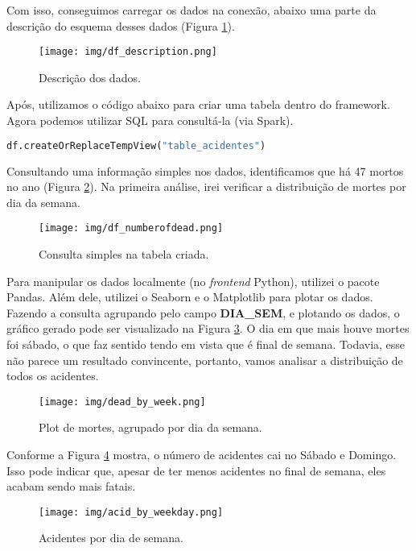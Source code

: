 \documentclass{article}
\begin{document}
Com isso, conseguimos carregar os dados na conexão, abaixo uma parte da descrição do esquema desses dados (Figura \ref{fig:df_description}).

\begin{figure}[H]
  \centering
  \texttt{[image: img/df\_description.png]}
  \caption{Descrição dos dados.}
  \label{fig:df_description}
\end{figure}

Após, utilizamos o código abaixo para criar uma tabela dentro do framework. Agora podemos utilizar SQL para consultá-la (via Spark).

\begin{lstlisting}[language=Python]
df.createOrReplaceTempView("table_acidentes")
\end{lstlisting}

Consultando uma informação simples nos dados, identificamos que há 47 mortos no ano (Figura \ref{fig:df_dead_no}). Na primeira análise, irei verificar a distribuição de mortes por dia da semana.

\begin{figure}[H]
  \texttt{[image: img/df\_numberofdead.png]}
  \caption{Consulta simples na tabela criada.}
  \label{fig:df_dead_no}
\end{figure}

Para manipular os dados localmente (no \emph{frontend} Python), utilizei o pacote Pandas. Além dele, utilizei o Seaborn e o Matplotlib para plotar os dados. Fazendo a consulta agrupando pelo campo \textbf{DIA\_SEM}, e plotando os dados, o gráfico gerado pode ser visualizado na Figura \ref{fig:df_dead_by_week}. O dia em que mais houve mortes foi sábado, o que faz sentido tendo em vista que é final de semana. Todavia, esse não parece um resultado convincente, portanto, vamos analisar a distribuição de todos os acidentes.

\begin{figure}[H]
  \centering
  \texttt{[image: img/dead\_by\_week.png]}
  \caption{Plot de mortes, agrupado por dia da semana.}
  \label{fig:df_dead_by_week}
\end{figure}


Conforme a Figura \ref{fig:acid_by_weekday} mostra, o número de acidentes cai no Sábado e Domingo. Isso pode indicar que, apesar de ter menos acidentes no final de semana, eles acabam sendo mais fatais.

\begin{figure}[H]
  \centering
  \texttt{[image: img/acid\_by\_weekday.png]}
  \caption{Acidentes por dia de semana.}
  \label{fig:acid_by_weekday}
\end{figure}
\end{document}
